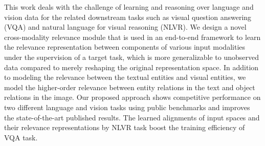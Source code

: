 This work deals with the challenge of learning and reasoning over language and vision data for the related downstream tasks such as visual question answering (VQA) and natural language for visual reasoning (NLVR). We design a novel cross-modality relevance module that is used in an end-to-end framework to learn the relevance representation between components of various input modalities under the supervision of a target task, which is more generalizable to unobserved data compared to merely reshaping the original representation space. In addition to modeling the relevance between the textual entities and visual entities, we model the higher-order relevance between entity relations in the text and object relations in the image. Our proposed approach shows competitive performance on two different language and vision tasks using public benchmarks and improves the state-of-the-art published results. The learned alignments of input spaces and their relevance representations by NLVR task boost the training efficiency of VQA task.
